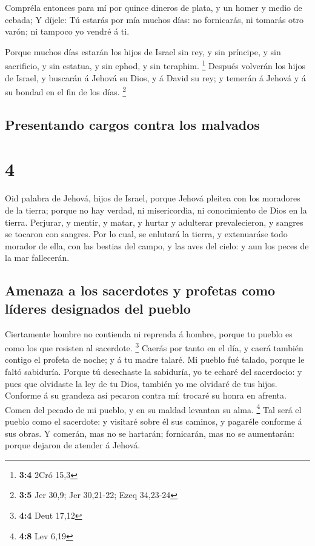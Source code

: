  Compréla entonces para mí por quince dineros de plata, y
un homer y medio de cebada;  Y díjele: Tú estarás por mía
muchos días: no fornicarás, ni tomarás otro varón; ni tampoco yo vendré
á ti.

 Porque muchos días estarán los hijos de Israel sin rey, y
sin príncipe, y sin sacrificio, y sin estatua, y sin ephod, y sin
teraphim. \footnote{\textbf{3:4} 2Cró 15,3}  Después
volverán los hijos de Israel, y buscarán á Jehová su Dios, y á David su
rey; y temerán á Jehová y á su bondad en el fin de los días. \footnote{\textbf{3:5}
  Jer 30,9; Jer 30,21-22; Ezeq 34,23-24}

\hypertarget{presentando-cargos-contra-los-malvados}{%
\subsection{Presentando cargos contra los
malvados}\label{presentando-cargos-contra-los-malvados}}

\hypertarget{section-3}{%
\section{4}\label{section-3}}

 Oid palabra de Jehová, hijos de Israel, porque Jehová
pleitea con los moradores de la tierra; porque no hay verdad, ni
misericordia, ni conocimiento de Dios en la tierra. 
Perjurar, y mentir, y matar, y hurtar y adulterar prevalecieron, y
sangres se tocaron con sangres.  Por lo cual, se enlutará
la tierra, y extenuaráse todo morador de ella, con las bestias del
campo, y las aves del cielo: y aun los peces de la mar fallecerán.

\hypertarget{amenaza-a-los-sacerdotes-y-profetas-como-luxedderes-designados-del-pueblo}{%
\subsection{Amenaza a los sacerdotes y profetas como líderes designados
del
pueblo}\label{amenaza-a-los-sacerdotes-y-profetas-como-luxedderes-designados-del-pueblo}}

 Ciertamente hombre no contienda ni reprenda á hombre,
porque tu pueblo es como los que resisten al sacerdote. \footnote{\textbf{4:4}
  Deut 17,12}  Caerás por tanto en el día, y caerá también
contigo el profeta de noche; y á tu madre talaré.  Mi
pueblo fué talado, porque le faltó sabiduría. Porque tú desechaste la
sabiduría, yo te echaré del sacerdocio: y pues que olvidaste la ley de
tu Dios, también yo me olvidaré de tus hijos.  Conforme á
su grandeza así pecaron contra mí: trocaré su honra en afrenta.
 Comen del pecado de mi pueblo, y en su maldad levantan su
alma. \footnote{\textbf{4:8} Lev 6,19}  Tal será el pueblo
como el sacerdote: y visitaré sobre él sus caminos, y pagaréle conforme
á sus obras.  Y comerán, mas no se hartarán; fornicarán,
mas no se aumentarán: porque dejaron de atender á Jehová.

